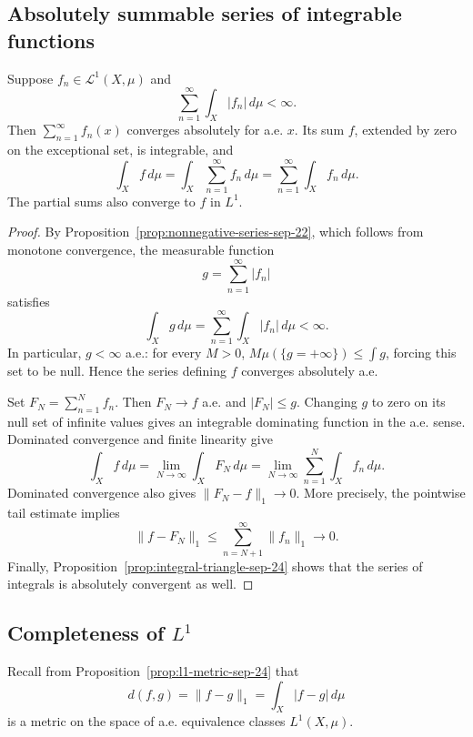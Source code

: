 \subsection{Absolutely summable series of integrable functions}

\begin{corollary}\label{cor:integrable-series-sep-29}
  Suppose $f_n\in\mathcal L^1(X,\mu)$ and
  \[
    \sum_{n=1}^{\infty}\int_X|f_n|\,d\mu<\infty.
  \]
  Then $\sum_{n=1}^{\infty}f_n(x)$ converges absolutely for a.e.
  $x$. Its sum $f$, extended by zero on the exceptional set, is
  integrable, and
  \[
    \int_X f\,d\mu
      =\int_X\sum_{n=1}^{\infty}f_n\,d\mu
      =\sum_{n=1}^{\infty}\int_X f_n\,d\mu.
  \]
  The partial sums also converge to $f$ in $L^1$.
\end{corollary}

\begin{proof}
  By Proposition~\ref{prop:nonnegative-series-sep-22}, which follows
  from monotone convergence, the measurable function
  \[
    g=\sum_{n=1}^{\infty}|f_n|
  \]
  satisfies
  \[
    \int_X g\,d\mu
      =\sum_{n=1}^{\infty}\int_X|f_n|\,d\mu<\infty.
  \]
  In particular, $g<\infty$ a.e.: for every $M>0$,
  $M\mu(\{g=+\infty\})\leq\int g$, forcing this set to be null.
  Hence the series defining $f$ converges absolutely a.e.

  Set $F_N=\sum_{n=1}^N f_n$. Then $F_N\to f$ a.e. and
  $|F_N|\leq g$. Changing $g$ to zero on its null set of infinite
  values gives an integrable dominating function in the a.e. sense.
  Dominated convergence and finite linearity give
  \[
    \int_X f\,d\mu
      =\lim_{N\to\infty}\int_X F_N\,d\mu
      =\lim_{N\to\infty}\sum_{n=1}^N\int_X f_n\,d\mu.
  \]
  Dominated convergence also gives $\|F_N-f\|_1\to0$. More precisely,
  the pointwise tail estimate implies
  \[
    \|f-F_N\|_1
      \leq\sum_{n=N+1}^{\infty}\|f_n\|_1\longrightarrow0.
  \]
  Finally, Proposition~\ref{prop:integral-triangle-sep-24} shows that
  the series of integrals is absolutely convergent as well.
\end{proof}

\subsection{Completeness of \texorpdfstring{$L^1$}{L1}}

Recall from Proposition~\ref{prop:l1-metric-sep-24} that
\[
  d(f,g)=\|f-g\|_1=\int_X|f-g|\,d\mu
\]
is a metric on the space of a.e. equivalence classes $L^1(X,\mu)$.

